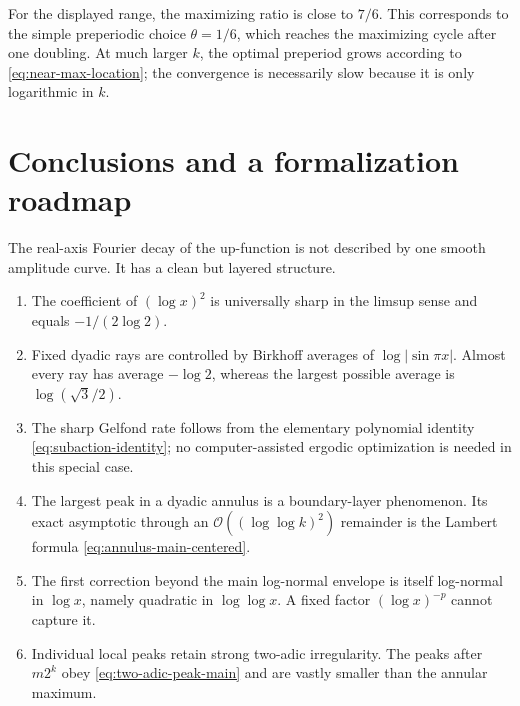 \documentclass[11pt,oneside]{article}
\theoremstyle{definition}
\theoremstyle{remark}
\newcommand{\bigO}{\mathcal O}
\begin{document}
For the displayed range, the maximizing ratio is close to \(7/6\).  This
corresponds to the simple preperiodic choice \(\theta=1/6\), which reaches the
maximizing cycle after one doubling.  At much larger \(k\), the optimal
preperiod grows according to \eqref{eq:near-max-location}; the convergence is
necessarily slow because it is only logarithmic in \(k\).

\section{Conclusions and a formalization roadmap}
\label{sec:conclusion}

The real-axis Fourier decay of the up-function is not described by one smooth
amplitude curve.  It has a clean but layered structure.

\begin{enumerate}
 \item The coefficient of \((\log x)^2\) is universally sharp in the limsup
 sense and equals \(-1/(2\log2)\).
 \item Fixed dyadic rays are controlled by Birkhoff averages of
 \(\log|\sin\pi x|\).  Almost every ray has average \(-\log2\), whereas the
 largest possible average is \(\log(\sqrt3/2)\).
 \item The sharp Gelfond rate follows from the elementary polynomial identity
 \eqref{eq:subaction-identity}; no computer-assisted ergodic optimization is
 needed in this special case.
 \item The largest peak in a dyadic annulus is a boundary-layer phenomenon.
 Its exact asymptotic through an \(\bigO((\log\log k)^2)\) remainder is the
 Lambert formula \eqref{eq:annulus-main-centered}.
 \item The first correction beyond the main log-normal envelope is itself
 log-normal in \(\log x\), namely quadratic in \(\log\log x\).  A fixed
 factor \((\log x)^{-p}\) cannot capture it.
 \item Individual local peaks retain strong two-adic irregularity.  The peaks
 after \(m2^k\) obey \eqref{eq:two-adic-peak-main} and are vastly smaller than
 the annular maximum.
\end{enumerate}
\end{document}
